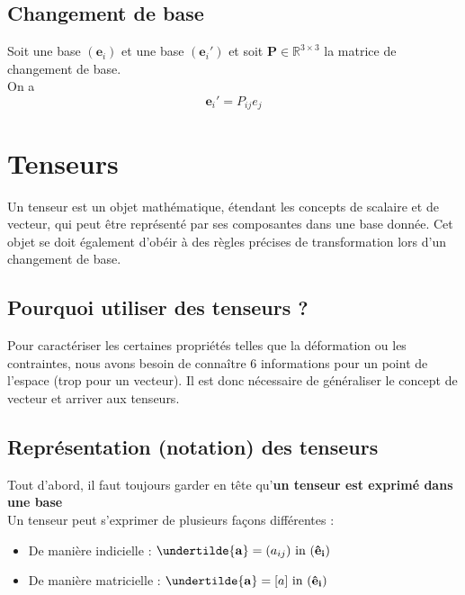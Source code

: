 \subsection{Changement de base}

Soit une base $(\textbf{e}_i)$ et une base $(\textbf{e}_i')$ et soit $\textbf{P} \in \mathbb{R}^{3\times 3}$ la matrice de changement de base.\\

On a 
\begin{equation*}
    \textbf{e}_i' = P_{ij}e_j
\end{equation*}



\section{Tenseurs}

Un tenseur est un objet mathématique, étendant les concepts de scalaire et de vecteur, qui peut être représenté par ses composantes dans une base donnée. Cet objet se doit également d'obéir à des règles précises de transformation lors d'un changement de base.
\subsection{Pourquoi utiliser des tenseurs ?}
Pour caractériser les certaines propriétés telles que la déformation ou les contraintes, nous avons besoin de connaître 6 informations pour un point de l'espace (trop pour un vecteur). Il est donc nécessaire de généraliser le concept de vecteur et arriver aux tenseurs.

\subsection{Représentation (notation) des tenseurs}
Tout d'abord, il faut toujours garder en tête qu'\textbf{un tenseur est exprimé dans une base}\\

Un tenseur peut s'exprimer de plusieurs façons différentes : 
\begin{itemize}
    \item De manière indicielle : $\mathbf{\undertilde{a}} = (a_{ij}) \text{ in } (\mathbf{\hat{e}_i})$
    \item De manière matricielle :  $\mathbf{\undertilde{a}} = [a] \text{ in } (\mathbf{\hat{e}_i})$
\end{itemize}


